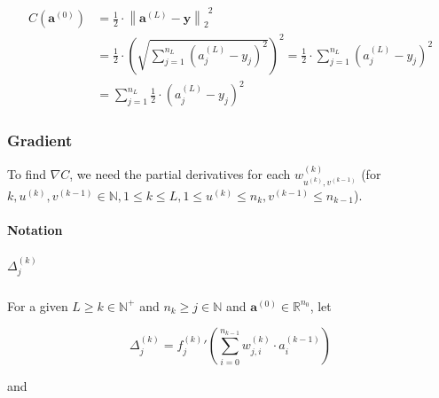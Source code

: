 \documentclass{article}
\begin{document}
      \begin{equation}\label{eqerror}
        \begin{split}
          C \left( \mathbf{a}^{(0)} \right)
              & = \frac{1}{2}
                  \cdot
                  \left\|
                    \mathbf{a}^{(L)} - \mathbf{y}
                  \right\|_2^{\enspace 2} \\
              & = \frac{1}{2}
                  \cdot
                  \left(
                    \sqrt{
                      \sum_{j=1}^{n_L} \left( a_j^{(L)} - y_j \right)^2
                    }
                  \right)^2
                = \frac{1}{2}
                  \cdot
                  \sum_{j=1}^{n_L} \left( a_j^{(L)} - y_j \right)^2 \\
              & = \sum_{j=1}^{n_L}
                    \frac{1}{2} \cdot \left( a_j^{(L)} - y_j \right)^2
        \end{split}
      \end{equation}

      \subsubsection{Gradient}

        To find $\nabla C$, we need the partial derivatives for each
        $w_{u^{(k)},v^{(k-1)}}^{(k)}$
        (for $
          k, u^{(k)}, v^{(k-1)} \in \mathbb{N},
          1 \leq k \leq L,
          1 \leq u^{(k)} \leq n_k,
          v^{(k-1)} \leq n_{k-1}
        $).

        \paragraph{Notation}

          \subparagraph{$\Delta_j^{(k)}$}

            For a given $L \geq k \in \mathbb{N}^+$ and
            $n_k \geq j \in \mathbb{N}$ and
            $\mathbf{a}^{(0)} \in \mathbb{R}^{n_0}$, let

            \begin{equation}
              \Delta_j^{(k)}
                = {f_j^{(k)}}' \left(
                    \sum_{i=0}^{n_{k-1}} w_{j,i}^{(k)} \cdot a_i^{(k-1)}
                  \right)
            \end{equation}

            and
\end{document}
